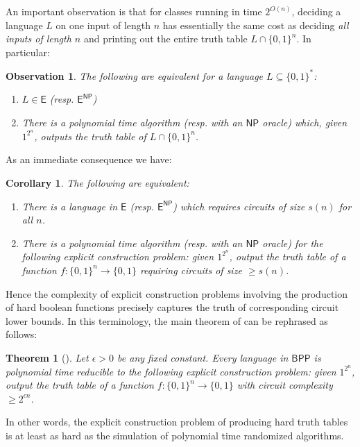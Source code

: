 \documentclass[11pt]{article}
\newtheorem{theorem}{Theorem}
\newtheorem{corollary}{Corollary}
\newtheorem{observation}{Observation}
\newcommand{\B}{\{0,1\}}
\begin{document}
An important observation is that for classes running in time $2^{O(n)}$, deciding a language $L$ on one input of length $n$ has essentially the same cost as deciding \emph{all inputs of length $n$} and printing out the entire truth table $L \cap \B^n$. In particular:
\begin{observation}
The following are equivalent for a language $L \subseteq \B^*$:
\begin{enumerate}
	\item $L \in \mathsf{E}$ (resp. $\mathsf{E^{NP}}$)
	\item There is a polynomial time algorithm (resp. with an $\mathsf{NP}$ oracle) which, given $1^{2^n}$, outputs the truth table of $L \cap \B^n$.
\end{enumerate}
\end{observation}

As an immediate consequence we have:
\begin{corollary}\label{cor:lb-ec-equivalence}
The following are equivalent:
\begin{enumerate}
	\item  There is a language in $\mathsf{E}$ (resp. $\mathsf{E^{NP}}$) which requires circuits of size $s(n)$ for all $n$.
	\item There is a polynomial time algorithm (resp. with an $\mathsf{NP}$ oracle) for the following explicit construction problem: given $1^{2^n}$, output the truth table of a function $f: \B^n \to \B$ requiring circuits of size $\geq s(n)$.
\end{enumerate}
	
\end{corollary}
Hence the complexity of explicit construction problems involving the production of hard boolean functions precisely captures the truth of corresponding circuit lower bounds. In this terminology, the main theorem of \cite{IW} can be rephrased as follows:
\begin{theorem}[\cite{IW}]\label{thm:IW-strong}
Let $\epsilon > 0$ be any fixed constant. Every language in $\mathsf{BPP}$ is polynomial time reducible to the following explicit construction problem: given $1^{2^n}$, output the truth table of a function $f: \B^n \to \B$ with circuit complexity $\geq 2^{\epsilon n}$.
\end{theorem}

In other words, the explicit construction problem of producing hard truth tables is at least as hard as the simulation of polynomial time randomized algorithms.
\end{document}
